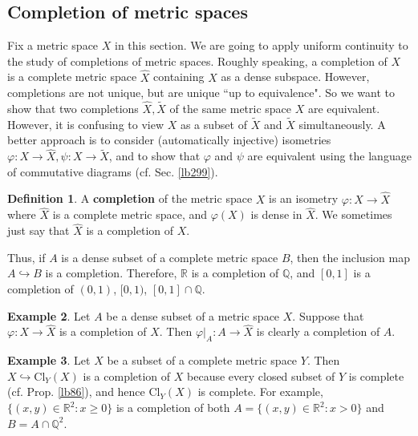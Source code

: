 \documentclass[12pt,b5paper,notitlepage]{article}
\theoremstyle{definition}
\newtheorem{df}{Definition}[section]
\newtheorem{eg}[df]{Example}
\theoremstyle{plain}
\newcommand{\wtd}{\widetilde}
\newcommand{\wht}{\widehat}
\newcommand{\Qbb}{\mathbb Q}
\newcommand{\Rbb}{\mathbb R}
\newcommand{\Cl}{\mathrm{Cl}}
\numberwithin{equation}{section}
\begin{document}
\subsection{Completion of metric spaces}



Fix a metric space $X$ in this section. We are going to apply uniform continuity to the study of completions of metric spaces. Roughly speaking, a completion of $X$ is a complete metric space $\wht X$ containing $X$ as a dense subspace. However, completions are not unique, but are unique ``up to equivalence". So we want to show that two completions $\wht X,\wtd X$ of the same metric space $X$ are equivalent. However,  it is confusing to view $X$ as a subset of $\wtd X$ and $\wtd X$ simultaneously. A better approach is to consider (automatically injective) isometries $\varphi:X\rightarrow\wht X,\psi:X\rightarrow\wtd X$, and to show that $\varphi$ and $\psi$ are equivalent using the language of commutative diagrams (cf. Sec. \ref{lb299}).


\begin{df}
A \textbf{completion}  of the metric space $X$ is an isometry $\varphi:X\rightarrow\wht X$ where $\wht X$ is a complete metric space, and $\varphi(X)$ is dense in $\wht X$. We sometimes just say that $\wht X$ is a completion of $X$.
\end{df}


Thus, if $A$ is a dense subset of a complete metric space $B$, then the inclusion map $A\hookrightarrow B$ is a completion. Therefore, $\Rbb$ is a completion of $\Qbb$, and $[0,1]$ is a completion of $(0,1)$, $[0,1)$, $[0,1]\cap\Qbb$.



\begin{eg}
Let $A$ be a dense subset of a metric space $X$. Suppose that $\varphi:X\rightarrow\wht X$ is a completion of $X$. Then $\varphi|_A:A\rightarrow \wht X$ is clearly a completion of $A$. 
\end{eg}

\begin{eg}
Let $X$ be a subset of a complete metric space $Y$. Then $X\hookrightarrow\Cl_Y(X)$ is a completion of $X$ because every closed subset of $Y$ is complete (cf. Prop. \ref{lb86}), and hence $\Cl_Y(X)$ is complete. For example, $\{(x,y)\in\Rbb^2:x\geq0\}$ is a completion of both $A=\{(x,y)\in\Rbb^2:x>0\}$ and $B=A\cap\Qbb^2$.
\end{eg}
\end{document}
